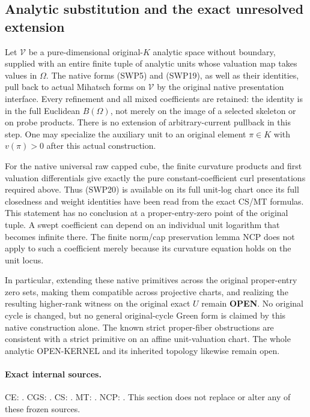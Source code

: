 \subsection{Analytic substitution and the exact unresolved extension}

Let $\mathcal V$ be a pure-dimensional original-$K$ analytic space
without boundary, supplied with an entire finite tuple of analytic
units whose valuation map takes values in $\Omega$.  The native
forms (SWP5) and (SWP19), as well as their identities, pull back to
actual Mihatsch forms on $\mathcal V$ by the original native
presentation interface.  Every refinement and all mixed coefficients
are retained: the identity is in the full Euclidean $B(\Omega)$,
not merely on the image of a selected skeleton or on probe products.
There is no extension of arbitrary-current pullback in this step.
One may specialize the auxiliary unit to an original element
$\pi\in K$ with $v(\pi)>0$ after this actual construction.

For the native universal raw capped cube, the finite curvature
products and first valuation differentials give exactly the pure
constant-coefficient curl presentations required above.  Thus (SWP20)
is available on its full unit-log chart once its full closedness and
weight identities have been read from the exact CS/MT formulas.
This statement has no conclusion at a proper-entry-zero point of
the original tuple.  A swept coefficient can depend on an individual
unit logarithm that becomes infinite there.  The finite norm/cap
preservation lemma NCP does not apply to such a coefficient merely
because its curvature equation holds on the unit locus.

In particular, extending these native primitives across the original
proper-entry zero sets, making them compatible across projective
charts, and realizing the resulting higher-rank witness on the
original exact $U$ remain \textbf{OPEN}.  No original cycle is
changed, but no general original-cycle Green form is claimed by this
native construction alone.  The known strict proper-fiber
obstructions are consistent with a strict primitive on an affine
unit-valuation chart.  The whole analytic OPEN-KERNEL and its
inherited topology likewise remain open.

\paragraph{Exact internal sources.}
CE: .
CGS: .
CS: .
MT: .
NCP: .
This section does not replace or alter any of these frozen sources.
